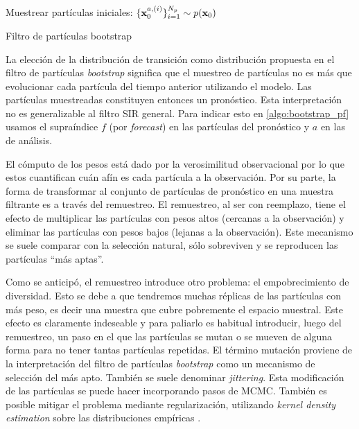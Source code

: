 \begin{algorithm}[H]\label{algo:bootstrap_pf}
    Muestrear partículas iniciales: $\{\mathbf{x}_0^{a, (i)}\}_{i=1}^{N_p} \sim p(\mathbf{x}_0)$
    
\caption{Filtro de partículas bootstrap}
\end{algorithm}

La elección de la distribución de transición como distribución propuesta en el filtro de partículas \textit{bootstrap} significa que el muestreo de partículas no es más que evolucionar cada partícula del tiempo anterior utilizando el modelo. Las partículas muestreadas constituyen entonces un pronóstico. Esta interpretación no es generalizable al filtro SIR general. Para indicar esto en \ref{algo:bootstrap_pf} usamos el supraíndice $f$ (por \textit{forecast}) en las partículas del pronóstico y $a$ en las de análisis.

El cómputo de los pesos está dado por la verosimilitud observacional por lo que estos cuantifican cuán afín es cada partícula a la observación. Por su parte, la forma de transformar al conjunto de partículas de pronóstico en una muestra filtrante es a través del remuestreo. El remuestreo, al ser con reemplazo, tiene el efecto de multiplicar las partículas con pesos altos (cercanas a la observación) y eliminar las partículas con pesos bajos (lejanas a la observación). Este mecanismo se suele comparar con la selección natural, sólo sobreviven y se reproducen las partículas ``más aptas''.

Como se anticipó, el remuestreo introduce otro problema: el empobrecimiento de diversidad. Esto se debe a que tendremos muchas réplicas de las partículas con más peso, es decir una muestra que cubre pobremente el espacio muestral. Este efecto es claramente indeseable y para paliarlo es habitual introducir, luego del remuestreo, un paso en el que las partículas se mutan o se mueven de alguna forma para no tener tantas partículas repetidas. El término mutación proviene de la interpretación del filtro de partículas \textit{bootstrap} como un mecanismo de selección del más apto. También se suele denominar \textit{jittering}. Esta modificación de las partículas se puede hacer incorporando pasos de MCMC. También es posible mitigar el problema mediante regularización, utilizando \textit{kernel density estimation} sobre las distribuciones empíricas \citep{Sarkka2013, Arulampalam2002, Ruchi2019}.

